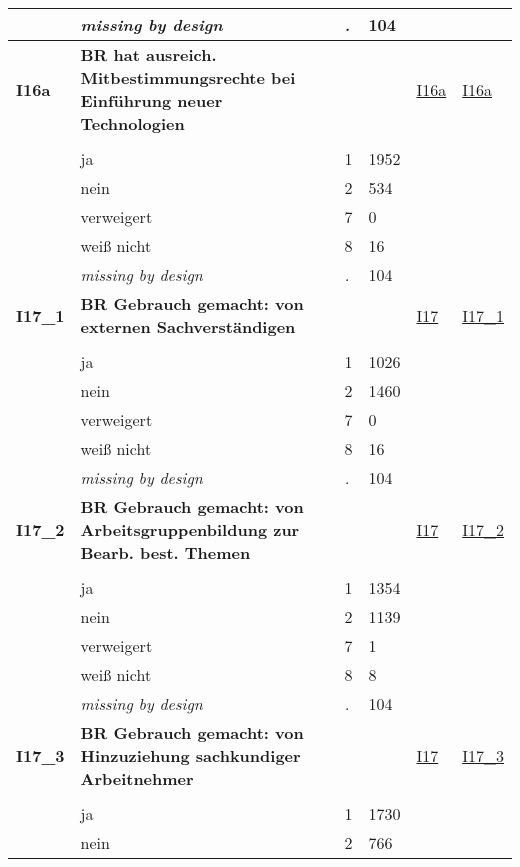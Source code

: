 \begin{longtable}{| L{2.45cm} | L{6cm} | C{1.5cm} | R{1cm} | C{2.25cm} | C{2.25cm} |}
   & \textit{missing by design} & \textit{.} & 104 &  &  \\ 
   \midrule
\textbf{I16a}\label{var:I16a} & \textbf{BR hat ausreich. Mitbestimmungsrechte bei Einführung neuer Technologien} &  &  & \hyperref[I16a]{I16a} & \hyperref[var:suf:I16a]{I16a} \\ 
   &  &  &  &  &  \\ 
   & ja & 1 & 1952 &  &  \\ 
   & nein & 2 & 534 &  &  \\ 
   & verweigert & 7 & 0 &  &  \\ 
   & weiß nicht & 8 & 16 &  &  \\ 
   & \textit{missing by design} & \textit{.} & 104 &  &  \\ 
   \midrule
\textbf{I17\_1}\label{var:I17:1} & \textbf{BR Gebrauch gemacht: von externen Sachverständigen} &  &  & \hyperref[I17]{I17} & \hyperref[var:suf:I17:1]{I17\_1} \\ 
   &  &  &  &  &  \\ 
   & ja & 1 & 1026 &  &  \\ 
   & nein & 2 & 1460 &  &  \\ 
   & verweigert & 7 & 0 &  &  \\ 
   & weiß nicht & 8 & 16 &  &  \\ 
   & \textit{missing by design} & \textit{.} & 104 &  &  \\ 
   \midrule
\textbf{I17\_2}\label{var:I17:2} & \textbf{BR Gebrauch gemacht: von Arbeitsgruppenbildung zur Bearb. best. Themen} &  &  & \hyperref[I17]{I17} & \hyperref[var:suf:I17:2]{I17\_2} \\ 
   &  &  &  &  &  \\ 
   & ja & 1 & 1354 &  &  \\ 
   & nein & 2 & 1139 &  &  \\ 
   & verweigert & 7 & 1 &  &  \\ 
   & weiß nicht & 8 & 8 &  &  \\ 
   & \textit{missing by design} & \textit{.} & 104 &  &  \\ 
   \midrule
\textbf{I17\_3}\label{var:I17:3} & \textbf{BR Gebrauch gemacht: von Hinzuziehung sachkundiger Arbeitnehmer} &  &  & \hyperref[I17]{I17} & \hyperref[var:suf:I17:3]{I17\_3} \\ 
   &  &  &  &  &  \\ 
   & ja & 1 & 1730 &  &  \\ 
   & nein & 2 & 766 &  &  \\ 

\end{longtable}
